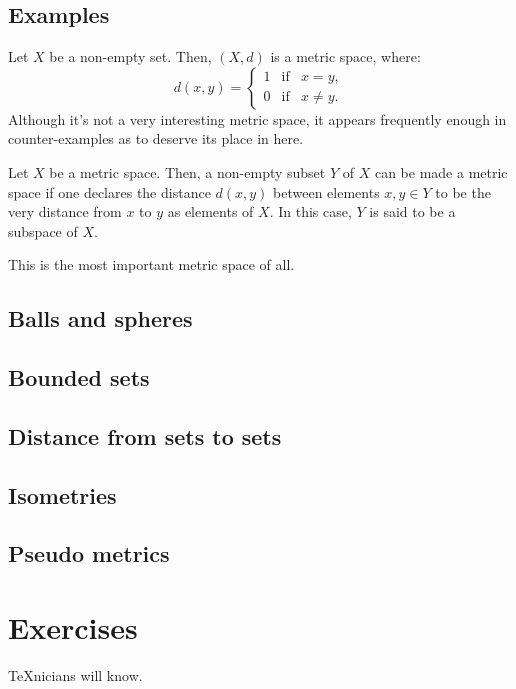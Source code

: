\subsection{Examples}

\begin{example}\label{example:the-0-1-metric}
  Let \(X\) be a non-empty set. Then, \((X,d)\) is a metric space, where:
  \begin{equation*}
    d(x,y)=
    \left\{
      \begin{array}{lll}
        1 & \text{if} & x=y, \\
        0 & \text{if} & x\neq{y}.
      \end{array}
    \right.
  \end{equation*}
  Although it's not a very interesting metric space, it appears frequently
  enough in counter-examples as to deserve its place in here.
\end{example}

\begin{example}[Subspaces]\label{example:subspaces}
  Let \(X\) be a metric space. Then, a non-empty subset \(Y\) of \(X\) can be
  made a metric space if one declares the distance \(d(x,y)\) between elements
  \(x,y\in{Y}\) to be the very distance from \(x\) to \(y\) as elements of
  \(X\). In this case, \(Y\) is said to be a subspace of \(X\).
\end{example}

\begin{example}\label{example:the-real-line}
  This is the most important metric space of all.
\end{example}


\subsection{Balls and spheres}

\subsection{Bounded sets}

\subsection{Distance from sets to sets}

\subsection{Isometries}

\subsection{Pseudo metrics}

\section{Exercises}

\begin{exercise}
  \TeX{}nicians will know.
\end{exercise}
